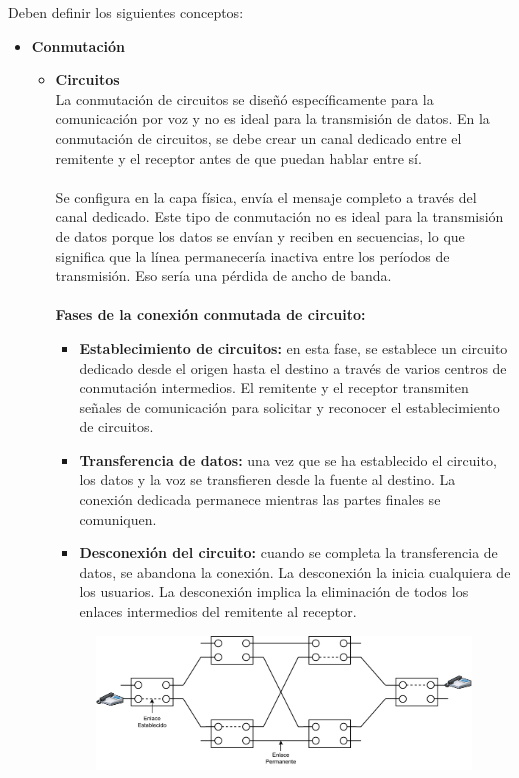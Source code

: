 {\color{red} Deben definir los siguientes conceptos:}
\begin{itemize}
	\item \textbf{{\color{red}Conmutación}}
	\begin{itemize}
		\item \textbf{{\color{red}Circuitos}} \\
		La conmutación de circuitos se diseñó específicamente para la comunicación por voz y no es ideal para la transmisión de datos. En la conmutación de circuitos, se debe crear un canal dedicado entre el remitente y el receptor antes de que puedan hablar entre sí. \\{ }\\
		Se configura en la capa física, envía el mensaje completo a través del canal dedicado. Este tipo de conmutación no es ideal para la transmisión de datos porque los datos se envían y reciben en secuencias, lo que significa que la línea permanecería inactiva entre los períodos de transmisión. Eso sería una pérdida de ancho de banda.
		\\{ }\\
		\textbf{Fases de la conexión conmutada de circuito:}		
		\begin{itemize}
		\item \textbf{Establecimiento de circuitos:} en esta fase, se establece un circuito dedicado desde el origen hasta el destino a través de varios centros de conmutación intermedios. El remitente y el receptor transmiten señales de comunicación para solicitar y reconocer el establecimiento de circuitos. \\
		\item\textbf{ Transferencia de datos:} una vez que se ha establecido el circuito, los datos y la voz se transfieren desde la fuente al destino. La conexión dedicada permanece mientras las partes finales se comuniquen.\\
		\item \textbf{Desconexión del circuito:} cuando se completa la transferencia de datos, se abandona la conexión. La desconexión la inicia cualquiera de los usuarios. La desconexión implica la eliminación de todos los enlaces intermedios del remitente al receptor. \\
		\end{itemize}
		
\begin{figure}[ht!]
\centering
\includegraphics[scale=0.5]{Imagenes/circuito.pdf}
\end{figure}		
		

\end{itemize}
\end{itemize}
